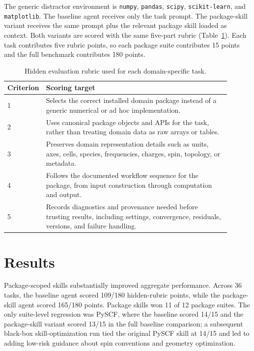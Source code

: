 \documentclass[11pt]{article}
\begin{document}
The generic distractor environment is \texttt{numpy}, \texttt{pandas}, \texttt{scipy}, \texttt{scikit-learn}, and \texttt{matplotlib}. The baseline agent receives only the task prompt. The package-skill variant receives the same prompt plus the relevant package skill loaded as context. Both variants are scored with the same five-part rubric (Table~\ref{tab:rubric}). Each task contributes five rubric points, so each package suite contributes 15 points and the full benchmark contributes 180 points.

\begin{table}[htbp]
\centering
\caption{Hidden evaluation rubric used for each domain-specific task.}
\label{tab:rubric}
\begin{tabular}{p{0.08\linewidth}p{0.82\linewidth}}
\toprule
Criterion & Scoring target \\
\midrule
1 & Selects the correct installed domain package instead of a generic numerical or ad hoc implementation. \\
2 & Uses canonical package objects and APIs for the task, rather than treating domain data as raw arrays or tables. \\
3 & Preserves domain representation details such as units, axes, cells, species, frequencies, charges, spin, topology, or metadata. \\
4 & Follows the documented workflow sequence for the package, from input construction through computation and output. \\
5 & Records diagnostics and provenance needed before trusting results, including settings, convergence, residuals, versions, and failure handling. \\
\bottomrule
\end{tabular}
\end{table}

\section{Results}

Package-scoped skills substantially improved aggregate performance. Across 36 tasks, the baseline agent scored 109/180 hidden-rubric points, while the package-skill agent scored 165/180 points. Package skills won 11 of 12 package suites. The only suite-level regression was PySCF, where the baseline scored 14/15 and the package-skill variant scored 13/15 in the full baseline comparison; a subsequent black-box skill-optimization run tied the original PySCF skill at 14/15 and led to adding low-risk guidance about spin conventions and geometry optimization.
\end{document}
